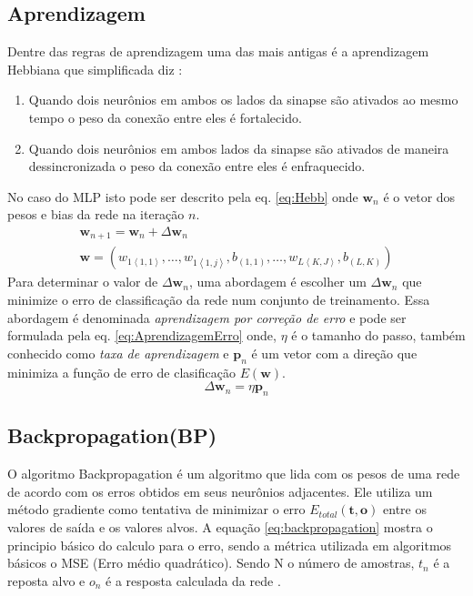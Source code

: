\subsection{Aprendizagem}
Dentre das regras de aprendizagem uma das mais antigas \'e a aprendizagem Hebbiana que simplificada diz \cite{Haykin2008}:
\begin{enumerate}
	\item Quando dois neur\^onios em ambos os lados da sinapse s\~ao ativados ao mesmo tempo o peso da conex\~ao entre eles \'e fortalecido.
	\item Quando dois neur\^onios em ambos lados da sinapse s\~ao ativados de maneira dessincronizada o peso da conex\~ao entre eles \'e enfraquecido.
\end{enumerate}
No caso do \acl{MLP} isto pode ser descrito pela eq. \ref{eq:Hebb} onde $\textbf{w}_n$ \'e o vetor dos pesos e bias da rede na itera\c{c}\~ao $n$.  
\begin{eqnarray}\label{eq:Hebb}
\textbf{w}_{n+1}=\textbf{w}_n+\Delta \textbf{w}_n\\
\textbf{w}=\left(w_{1\left< 1,1 \right> },\dots,w_{1\left< 1,j \right>},b_{\left(1,1 \right)},\dots,w_{L\left< K,J \right>},b_{\left(L,K \right)} \right)
\end{eqnarray}
Para determinar o valor de $\Delta \textbf{w}_n$, uma abordagem \'e escolher um  $\Delta \textbf{w}_n$ que minimize o erro de classifica\c{c}\~ao da rede num conjunto de treinamento. Essa abordagem \'e denominada \textit{aprendizagem por corre\c{c}\~ao de erro} \cite{Haykin2008} e pode ser formulada pela eq. \ref{eq:AprendizagemErro} onde, $\eta$ \'e o tamanho do passo, tamb\'em conhecido como \textit{taxa de aprendizagem}  e $\textbf{p}_n$ \'e um vetor com a dire\c{c}\~ao que minimiza a fun\c{c}\~ao de erro  de clasifica\c{c}\~ao $E(\textbf{w})$.
\begin{equation}\label{eq:AprendizagemErro}
\Delta \textbf{w}_n= \eta \textbf{p}_n
\end{equation}

\subsection{Backpropagation(BP)}

O algoritmo Backpropagation é um algoritmo que lida com os pesos de uma rede de acordo com os erros obtidos em seus neurônios adjacentes.  Ele utiliza um método gradiente como tentativa de minimizar o erro $E_{total}(\textbf{t},\textbf{o})$ entre os valores de saída e os valores alvos. A equação \ref{eq:backpropagation} mostra o principio básico do calculo para o erro, sendo a métrica utilizada em algoritmos b\'asicos o MSE (Erro médio quadrático). Sendo N o número de amostras, $t_n$ é a reposta alvo e $o_n$ é a resposta calculada da rede \cite{Haykin2008}.


